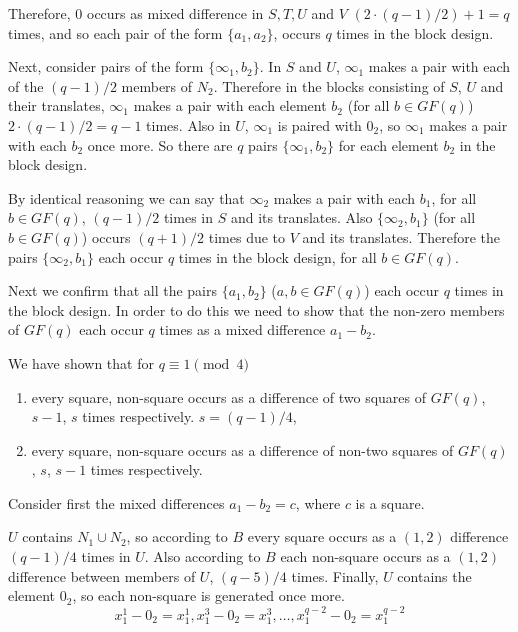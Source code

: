 \documentclass[11pt, a4paper]{book}\usepackage[]{graphicx}\usepackage[]{xcolor}
\begin{document}
Therefore, 0 occurs as mixed difference in $S, T, U$ and $V$
$(2\cdot (q - 1)/2) + 1 = q$ times, and so each pair of the
form $\{a_1, a_2\}$, occurs $q$ times in the block design.

Next, consider pairs of the form $\{\infty _1, b_2\}$. In
$S$ and $U$, $\infty _1$ makes a pair with each of the
$(q - 1)/2$ members of $N_2$.  Therefore in the blocks
consisting of $S$, $U$ and their translates, $\infty _1$
makes a pair with each element $b_2$ (for all $b \in GF(q)$)
$2 \cdot (q - 1)/2 = q - 1$ times. Also in $U$, $\infty _1$ is
paired with $0_2$, so $\infty _1$ makes a pair with each
$b_2$ once more. So there are $q$ pairs $\{\infty _1, b_2\}$
for each element $b_2$ in the block design.

By identical reasoning we can say that $\infty _2$ makes a
pair with each $b_1$, for all $b \in GF(q)$, $(q - 1)/2$ times
in $S$ and its translates. Also $\{\infty _2, b_1\}$ (for all
$b \in GF(q)$) occurs $(q + 1)/2$ times due to $V$ and its
translates.  Therefore the pairs $\{\infty _2, b_1 \}$ each
occur $q$ times in the block design, for all $b \in GF(q)$.

Next we confirm that all the pairs
$\{a_1, b_2\}$ ($a, b \in GF(q)$) each occur $q$ times in the
block design. In order to do this we need to show that the
non-zero members of $GF(q)$ each occur $q$ times as a mixed
difference $a_1 - b_2$.

We have shown that for $q \equiv 1\pmod 4$
\begin{enumerate}
  \item{every square, non-square occurs as a difference of two
      squares of $GF(q)$, $s - 1$, $s$ times respectively.
      $s = (q - 1)/4$,}
  \item{every square, non-square occurs as a difference of
      non-two squares of $GF(q)$, $s$, $s - 1$ times
      respectively.}
\end{enumerate}

Consider first the mixed differences $a_1 - b_2 = c$, where
$c$ is a square.

$U$ contains $N_1 \cup N_2$, so according to $B$ every
square occurs as a $(1, 2)$ difference $(q - 1)/4$ times in
$U$. Also according to $B$ each non-square occurs as a $(1, 2)$
difference between members of $U$, $(q - 5)/4$ times.
Finally, $U$ contains the element $0_2$, so each non-square
is generated once more.
\begin{equation}
x_1^1 - 0_2 = x^1_1, x_1^3 - 0_2 = x_1^3, \ldots, x_1^{q - 2} - 0_2 = x_1^{q - 2}
\end{equation}
\end{document}
